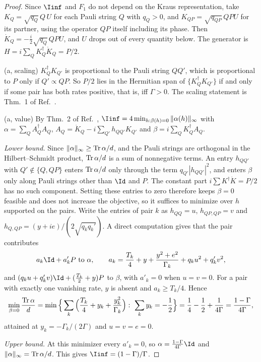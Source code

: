 \begin{proof}
Since $\Iinf$ and $F_1$ do not depend on the Kraus representation, take $K_Q=\sqrt{q_Q}\,Q\,U$ for each Pauli string $Q$ with $q_Q>0$, and $K_{QP}=\sqrt{q_{QP}}\,QPU$ for its partner, using the operator $QP$ itself including its phase. Then $\dot K_Q=-\frac i2\sqrt{q_Q}\,QPU$, and $U$ drops out of every quantity below. The generator is $H=i\sum_QK_Q^\dagger\dot K_Q=P/2$.

(a, scaling) $K_Q^\dagger K_{Q'}$ is proportional to the Pauli string $QQ'$, which is proportional to $P$ only if $Q'\propto QP$. So $P/2$ lies in the Hermitian span of $\{K_Q^\dagger K_{Q'}\}$ if and only if some pair has both rates positive, that is, iff $\Gamma>0$. The scaling statement is Thm.~1 of Ref.~\cite{ZhouJiang2021}.

(a, value) By Thm.~2 of Ref.~\cite{ZhouJiang2021}, $\Iinf=4\min_{h:\beta(h)=0}\|\alpha(h)\|_\infty$ with $\alpha=\sum_QA_Q^\dagger A_Q$, $A_Q=\dot K_Q-i\sum_{Q'}h_{QQ'}K_{Q'}$ and $\beta=i\sum_QK_Q^\dagger A_Q$.

\emph{Lower bound.} Since $\|\alpha\|_\infty\ge\operatorname{Tr}\alpha/d$, and the Pauli strings are orthogonal in the Hilbert--Schmidt product, $\operatorname{Tr}\alpha/d$ is a sum of nonnegative terms. An entry $h_{QQ'}$ with $Q'\notin\{Q,QP\}$ enters $\operatorname{Tr}\alpha/d$ only through the term $q_{Q'}|h_{QQ'}|^2$, and enters $\beta$ only along Pauli strings other than $\Id$ and $P$. The constant part $i\sum K^\dagger\dot K=P/2$ has no such component. Setting these entries to zero therefore keeps $\beta=0$ feasible and does not increase the objective, so it suffices to minimize over $h$ supported on the pairs. Write the entries of pair $k$ as $h_{QQ}=u$, $h_{QP,QP}=v$ and $h_{Q,QP}=(y+ie)/(2\sqrt{q_kq_k'})$. A direct computation gives that the pair contributes
\begin{equation}
a_k\Id+a'_kP\ \text{to}\ \alpha,\qquad a_k=\frac{T_k}{4}+y+\frac{y^2+e^2}{\Gamma_k}+q_ku^2+q_k'v^2,
\end{equation}
and $(q_ku+q_k'v)\Id+(\frac{T_k}{2}+y)P$ to $\beta$, with $a'_k=0$ when $u=v=0$. For a pair with exactly one vanishing rate, $y$ is absent and $a_k\ge T_k/4$. Hence
\begin{equation}
\min_{\beta=0}\frac{\Tr\alpha}{d}=\min\Big\{\sum_k\Big(\frac{T_k}4+y_k+\frac{y_k^2}{\Gamma_k}\Big):\ \sum_ky_k=-\frac12\Big\}=\frac14-\frac12+\frac1{4\Gamma}=\frac{1-\Gamma}{4\Gamma},
\end{equation}
attained at $y_k=-\Gamma_k/(2\Gamma)$ and $u=v=e=0$.

\emph{Upper bound.} At this minimizer every $a'_k=0$, so $\alpha=\frac{1-\Gamma}{4\Gamma}\Id$ and $\|\alpha\|_\infty=\operatorname{Tr}\alpha/d$. This gives $\Iinf=(1-\Gamma)/\Gamma$.


\end{proof}
